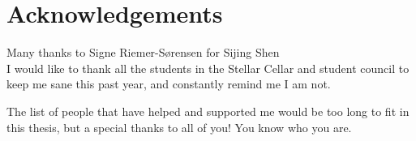 \section*{Acknowledgements}

Many thanks to Signe Riemer-S{\o}rensen for  Sijing Shen  \\

I would like to thank all the students in the Stellar Cellar and student council to keep me sane this past year,
and constantly remind me I am not.

The list of people that have helped and supported me would be too long to fit in this thesis, but a special thanks to all of you!
You know who you are.

\newpage
